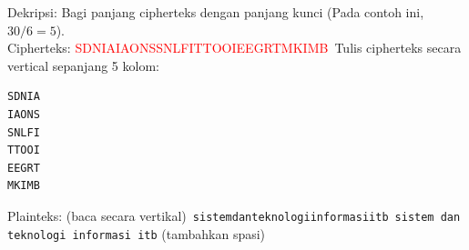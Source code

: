 \documentclass{article}
\begin{document}

Dekripsi: Bagi panjang cipherteks dengan panjang kunci (Pada contoh ini, $30 / 6 = 5$).\\
Cipherteks: \textcolor{red}{SDNIAIAONSSNLFITTOOIEEGRTMKIMB}\
Tulis cipherteks secara vertical sepanjang 5 kolom:\
\vspace{5mm}
\begin{verbatim}
SDNIA
IAONS
SNLFI
TTOOI
EEGRT
MKIMB
\end{verbatim}
\vspace{5mm}
Plainteks: (baca secara vertikal)\
\texttt{sistemdanteknologiinformasiitb}\
\texttt{sistem dan teknologi informasi itb} \quad (tambahkan spasi)
\end{document}
